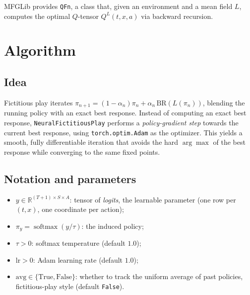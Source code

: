\documentclass[11pt,a4paper]{article}
\begin{document}
MFGLib provides \texttt{QFn}, a class that, given an environment and a mean
field $L$, computes the optimal $Q$-tensor $Q^L(t, x, a)$ via backward recursion.

\section{Algorithm}\label{sec:tabular}

\subsection{Idea}
Fictitious play \cite{perrin2020} iterates
$\pi_{n+1} = (1 - \alpha_n)\pi_n + \alpha_n\, \mathrm{BR}(L(\pi_n))$,
blending the running policy with an exact best response. Instead of computing
an exact best response, \texttt{NeuralFictitiousPlay} performs a
\emph{policy-gradient step} towards the current best response, using
\texttt{torch.optim.Adam} as the optimizer. This yields a smooth, fully
differentiable iteration that avoids the hard $\arg\max$ of the best response
while converging to the same fixed points.

\subsection{Notation and parameters}
\begin{itemize}
  \item $y \in \mathbb{R}^{(T+1) \times S \times A}$: tensor of \emph{logits},
        the learnable parameter (one row per $(t, x)$, one coordinate per action);
  \item $\pi_y = \operatorname{softmax}(y / \tau)$: the induced policy;
  \item $\tau > 0$: softmax temperature (default $1.0$);
  \item $\mathrm{lr} > 0$: Adam learning rate (default $1.0$);
  \item $\mathrm{avg} \in \{\mathrm{True}, \mathrm{False}\}$: whether to track
        the uniform average of past policies, fictitious-play style (default \texttt{False}).
\end{itemize}
\end{document}
